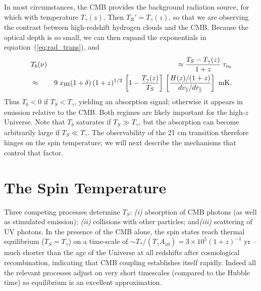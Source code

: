 In most circumstances, the CMB provides the background radiation source, for which with temperature $T_\gamma(z)$. Then $T_R' = T_{\gamma}(z)$, so that  we are observing the contrast between high-redshift hydrogen clouds and the CMB.   Because the optical depth is so small, we can then expand the exponentials in equation~(\ref{eq:rad_trans}), and
\begin{eqnarray}
& T_b(\nu) & \approx \frac{T_S-T_{\gamma}(z)}{1+z}\;\tau_{\nu_0} 
\label{eq:dtbone} \\
& \approx & 9\;x_{\rm HI}(1+\delta) \, (1+z)^{1/2}\, \left[1-\frac{T_{\gamma}(z)}{T_S}\right] \, \left[ \frac{H(z)/(1+z)}{d v_\parallel/d r_\parallel} \right] \ \mbox{mK}.
\label{eq:dtb}
\end{eqnarray}
Thus $T_b < 0$ if $T_S < T_{\gamma}$, yielding an absorption signal; otherwise it appears in emission relative to the CMB. Both regimes are likely important for the high-$z$ Universe. Note that $T_b$ saturates if $T_S \gg T_{\gamma}$, but the absorption can become arbitrarily large if $T_S \ll T_{\gamma}$.  The observability of the 21 cm transition therefore hinges on the spin temperature; we will next describe the mechanisms that control that factor.

\section{The Spin Temperature} \label{spin-temp}

Three competing processes determine $T_S$: {\it (i)} absorption of CMB photons (as well as stimulated emission); {\it (ii)} collisions with other particles; and{\it (iii)} scattering of UV photons.  In the presence of the CMB
alone, the spin states reach thermal equilibrium ($T_S=T_{\gamma}$) on a time-scale of $\sim T_*/(T_\gamma A_{10}) = 3 \times 10^5 (1+z)^{-1}$ yr -- much shorter than the age of the Universe at all redshifts after cosmological recombination, indicating that CMB coupling establishes itself rapidly. Indeed all the relevant processes adjust on very short timescales (compared to the Hubble time) so equilibrium is an excellent approximation.

